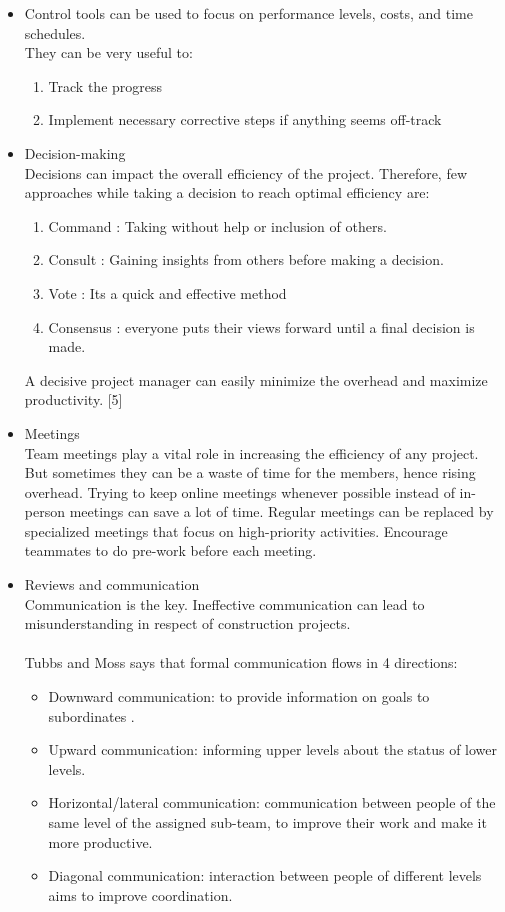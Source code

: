 \documentclass[a4paper,12pt]{article}
\begin{document}
\begin{itemize}
    \item Control tools can be used to focus on performance levels, costs, and time schedules. 
\\ They can be very useful to:

\begin{enumerate}
\item Track the progress
\item Implement necessary corrective steps if anything seems off-track
\end{enumerate}


 \item Decision-making 
\\Decisions can impact the overall efficiency of the project. Therefore, few approaches while taking a decision to reach optimal efficiency are:
\begin{enumerate}
\item Command : Taking without help or inclusion of others.
\item Consult : Gaining insights from others before making a decision.
\item Vote : Its a quick and effective method
\item Consensus : everyone puts their views forward until a final decision is made.
\end{enumerate}
A decisive project manager can easily minimize the overhead and maximize productivity. [5]


\item Meetings
\\ Team meetings play a vital role in increasing the efficiency of any project. But sometimes they can be a waste of time for the members, hence rising overhead.
Trying to keep online meetings whenever possible instead of in-person meetings can save a lot of time. Regular meetings can be replaced by specialized meetings that focus on high-priority activities. Encourage teammates to do pre-work before each meeting.

\item Reviews and communication
\\Communication is the key. Ineffective communication can lead to misunderstanding in respect of construction projects.
\\
\\  Tubbs and Moss says that formal communication flows in 4 directions:

\begin{itemize}%
  \renewcommand{\labelitemi}{$\Rightarrow$}
 \item Downward communication: to provide information on goals to subordinates .
 \item Upward communication: informing upper levels about the status of lower levels.
 \item Horizontal/lateral communication: communication between people of the same level of the assigned sub-team, to improve their work and make it more productive.
 \item Diagonal communication: interaction between people of different levels aims to improve coordination.
 

\end{itemize}
\end{itemize}
\end{document}
